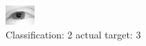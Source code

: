 \begin{figure}[h!]
\begin{center}
\includegraphics[width=0.60\columnwidth]{figures/ID2396_class_2_target_3.png}
\end{center}
\caption{ Classification: 2 actual target: 3}
\label{fig:ID2396_class_2_target_3}
\end{figure}
